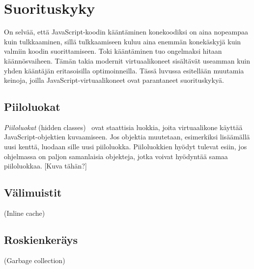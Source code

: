 \section{Suorituskyky}

On selvää, että JavaScript-koodin kääntäminen konekoodiksi on aina nopeampaa kuin tulkkaaminen, sillä tulkkaamiseen kuluu aina enemmän konekäskyjä kuin valmiin koodin suorittamiseen. Toki kääntäminen tuo ongelmaksi hitaan käännösvaiheen. Tämän takia modernit virtuaalikoneet sisältävät useamman kuin yhden kääntäjän eritasoisilla optimoinneilla. Tässä luvussa esitellään muutamia keinoja, joilla JavaScript-virtuaalikoneet ovat parantaneet suorituskykyä.

\subsection{Piiloluokat}

\textit{Piiloluokat} (hidden classes)~\cite{v8design} ovat staattisia luokkia, joita virtuaalikone käyttää JavaScript-objektien kuvaamiseen. Jos objektia muutetaan, esimerkiksi lisäämällä uusi kenttä, luodaan sille uusi piiloluokka. Piiloluokkien hyödyt tulevat esiin, jos ohjelmassa on paljon samanlaisia objekteja, jotka voivat hyödyntää samaa piiloluokkaa. [Kuva tähän?]

\subsection{Välimuistit}

(Inline cache)

\subsection{Roskienkeräys}

(Garbage collection)